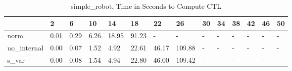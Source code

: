 \begin{table}
\caption{simple_robot, Time in Seconds to Compute CTL}
\label{simple_robot_CTL_time}
\begin{tabular}{llllllllllllll}
\toprule
 & 2 & 6 & 10 & 14 & 18 & 22 & 26 & 30 & 34 & 38 & 42 & 46 & 50 \\
\midrule
norm & 0.01 & 0.29 & 6.26 & 18.95 & 91.23 & - & - & - & - & - & - & - & - \\
no_internal & 0.00 & 0.07 & 1.52 & 4.92 & 22.61 & 46.17 & 109.88 & - & - & - & - & - & - \\
s_var & 0.00 & 0.08 & 1.54 & 4.94 & 22.80 & 46.00 & 109.42 & - & - & - & - & - & - \\
\bottomrule
\end{tabular}
\end{table}
